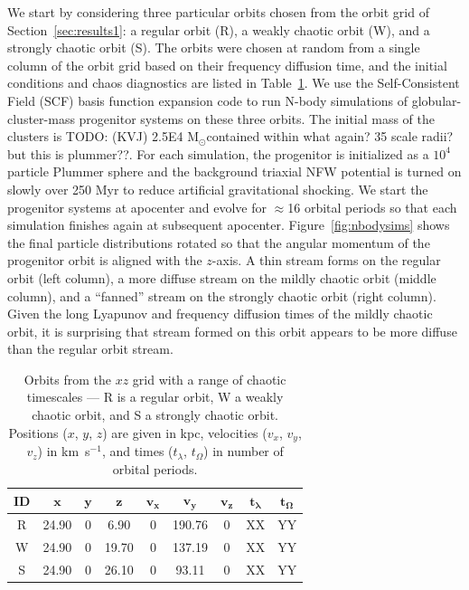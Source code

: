 \documentclass[letterpaper,12pt,preprint]{aastex}
\newcommand{\msun}{\ensuremath{\mathrm{M}_\odot}}
\newcommand{\bs}[1]{\boldsymbol{#1}}
\newcommand{\todo}[2]{{\color{red} TODO: (\MakeUppercase{#1}) #2}}
\begin{document}
We start by considering three particular orbits chosen from the orbit grid of Section~\ref{sec:results1}: a regular orbit (R), a weakly chaotic orbit (W), and a strongly chaotic orbit (S). The orbits were chosen at random from a single column of the orbit grid based on their frequency diffusion time, and the initial conditions and chaos diagnostics are listed in Table~\ref{tbl:three-orbits}. We use the Self-Consistent Field (SCF) basis function expansion code \citep{hernquist92} to run N-body simulations of globular-cluster-mass progenitor systems on these three orbits. The initial mass of the clusters is \todo{kvj}{2.5E4 \msun contained within what again? 35 scale radii? but this is plummer??}. For each simulation, the progenitor is initialized as a $10^4$ particle Plummer sphere and the background triaxial NFW potential is turned on slowly over 250 Myr to reduce artificial gravitational shocking. We start the progenitor systems at apocenter and evolve for $\approx$16 orbital periods so that each simulation finishes again at subsequent apocenter. Figure~\ref{fig:nbodysims} shows the final particle distributions rotated so that the angular momentum of the progenitor orbit is aligned with the $z$-axis. A thin stream forms on the regular orbit (left column), a more diffuse stream on the mildly chaotic orbit (middle column), and a ``fanned'' stream on the strongly chaotic orbit (right column). Given the long Lyapunov and frequency diffusion times of the mildly chaotic orbit, it is surprising that stream formed on this orbit appears to be more diffuse than the regular orbit stream. 

\begin{table}[ht]
\begin{center}
	\begin{tabular}{c | c c c c c c | c c }
		{\bf ID} & $\bs{x}$ & $\bs{y}$ & $\bs{z}$ & $\bs{v_x}$ & $\bs{v_y}$ & $\bs{v_z}$ & $\bs{t_\lambda}$ & $\bs{t_\Omega}$ \\\toprule
		R & 24.90 & 0 & 6.90 & 0 & 190.76 & 0 & XX & YY\\
		\midrule
		W & 24.90 & 0 & 19.70 & 0 & 137.19 & 0 & XX & YY\\
		\midrule
		S & 24.90 & 0 & 26.10 & 0 & 93.11 & 0 & XX & YY\\
		\bottomrule
		\end{tabular}
	\caption{Orbits from the $xz$ grid with a range of chaotic timescales --- R is a regular orbit, W a weakly chaotic orbit, and S a strongly chaotic orbit. Positions ($x$, $y$, $z$) are given in kpc, velocities ($v_x$, $v_y$, $v_z$) in km~s$^{-1}$, and times ($t_\lambda$, $t_\Omega$) in number of orbital periods. \label{tbl:three-orbits}}
\end{center}
\end{table}
\end{document}
